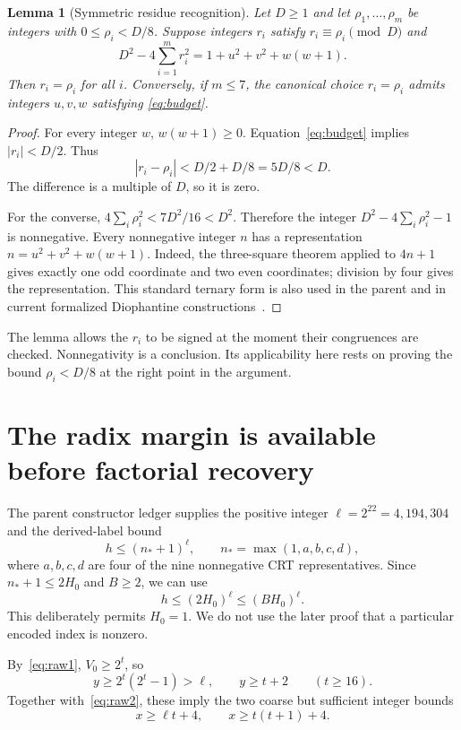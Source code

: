 \documentclass[11pt]{article}
\newtheorem{lemma}[theorem]{Lemma}
\begin{document}
\begin{lemma}[Symmetric residue recognition]\label{lem:recognition}
Let $D\ge1$ and let $\rho_1,\ldots,\rho_m$ be integers with
$0\le\rho_i<D/8$. Suppose integers $r_i$ satisfy
$r_i\equiv\rho_i\pmod D$ and
\begin{equation}
 D^2-4\sum_{i=1}^m r_i^2
      =1+u^2+v^2+w(w+1).
 \label{eq:budget}
\end{equation}
Then $r_i=\rho_i$ for all $i$. Conversely, if $m\le7$, the canonical
choice $r_i=\rho_i$ admits integers $u,v,w$ satisfying
\eqref{eq:budget}.
\end{lemma}
\begin{proof}
For every integer $w$, $w(w+1)\ge0$. Equation~\eqref{eq:budget}
implies $|r_i|<D/2$. Thus
\[
 |r_i-\rho_i|<D/2+D/8=5D/8<D.
\]
The difference is a multiple of $D$, so it is zero.

For the converse,
$4\sum_i\rho_i^2<7D^2/16<D^2$. Therefore the integer
$D^2-4\sum_i\rho_i^2-1$ is nonnegative. Every nonnegative integer $n$
has a representation $n=u^2+v^2+w(w+1)$. Indeed, the three-square theorem
applied to $4n+1$ gives exactly one odd coordinate and two even
coordinates; division by four gives the representation. This standard
ternary form is also used in the parent and in current formalized
Diophantine constructions~\cite{bayer}.
\end{proof}

The lemma allows the $r_i$ to be signed at the moment their congruences
are checked. Nonnegativity is a conclusion. Its applicability here rests
on proving the bound $\rho_i<D/8$ at the right point in the argument.

\section{The radix margin is available before factorial recovery}
\label{sec:margin}

The parent constructor ledger supplies the positive integer
$\ell=2^{22}=4,194,304$ and the derived-label bound
\[
 h\le(n_*+1)^\ell,
 \qquad n_*=\max(1,a,b,c,d),
\]
where $a,b,c,d$ are four of the nine nonnegative CRT representatives.
Since $n_*+1\le2H_0$ and $B\ge2$, we can use
\begin{equation}
 h\le(2H_0)^\ell\le(BH_0)^\ell.
 \label{eq:derivedbound}
\end{equation}
This deliberately permits $H_0=1$. We do not use the later proof that a
particular encoded index is nonzero.

By~\eqref{eq:raw1}, $V_0\ge2^t$, so
\[
 y\ge2^t(2^t-1)>\ell,\qquad y\ge t+2\qquad(t\ge16).
\]
Together with~\eqref{eq:raw2}, these imply the two coarse but sufficient
integer bounds
\begin{equation}
 x\ge\ell t+4,\qquad x\ge t(t+1)+4.
 \label{eq:gaps}
\end{equation}
\end{document}
